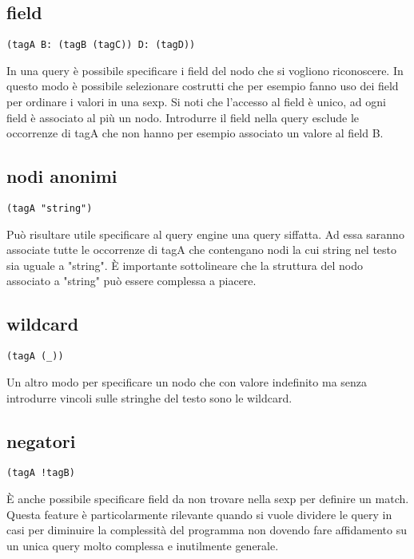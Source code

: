 \subsection{field}

\begin{lstlisting}
(tagA B: (tagB (tagC)) D: (tagD))
\end{lstlisting}

In una query \`e possibile specificare i field del nodo che si vogliono riconoscere.
In questo modo \`e possibile selezionare costrutti che per esempio fanno uso dei field per ordinare i valori in una sexp.
Si noti che l'accesso al field \`e unico, ad ogni field \`e associato al pi\`u un nodo.
Introdurre il field nella query esclude le occorrenze di tagA che non hanno per esempio associato un valore al field B.

\subsection{nodi anonimi}

\begin{lstlisting}
(tagA "string")
\end{lstlisting}

Pu\`o risultare utile specificare al query engine una query siffatta.
Ad essa saranno associate tutte le occorrenze di tagA che contengano nodi la cui string nel testo sia uguale a "string".
\`E importante sottolineare che la struttura del nodo associato a "string" pu\`o essere complessa a piacere.

\subsection{wildcard}

\begin{lstlisting}
(tagA (_))
\end{lstlisting}

Un altro modo per specificare un nodo che con valore indefinito ma senza introdurre vincoli sulle stringhe del testo sono le wildcard.

\subsection{negatori}

\begin{lstlisting}
(tagA !tagB)
\end{lstlisting}

\`E anche possibile specificare field da non trovare nella sexp per definire un match.
Questa feature \`e particolarmente rilevante quando si vuole dividere le query in casi per diminuire la complessit\`a del programma non dovendo fare affidamento su un unica query molto complessa e inutilmente generale.

